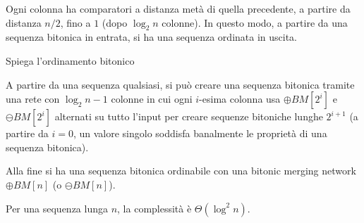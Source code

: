 \begin{questions}
\begin{solution}
        Ogni colonna ha comparatori a distanza metà di quella precedente, a partire da distanza $n/2$, fino a $1$ (dopo $\log_2 n$ colonne). In questo modo, a partire da una sequenza bitonica in entrata, si ha una sequenza ordinata in uscita.
    \end{solution}
    
    \question Spiega l'ordinamento bitonico
    
    \begin{solution}
        A partire da una sequenza qualsiasi, si può creare una sequenza bitonica tramite una rete con $\log_2 n - 1$ colonne in cui ogni $i$-esima colonna usa $\oplus BM [2^i]$ e $\ominus BM [2^i]$ alternati su tutto l'input per creare sequenze bitoniche lunghe $2^{i+1}$ (a partire da $i=0$, un valore singolo soddisfa banalmente le proprietà di una sequenza bitonica).
        
        Alla fine si ha una sequenza bitonica ordinabile con una bitonic merging network $\oplus BM [n]$ (o $\ominus BM [n]$).
        
        Per una sequenza lunga $n$, la complessità è $\Theta (\log^2 n)$.
    \end{solution}
\end{questions}